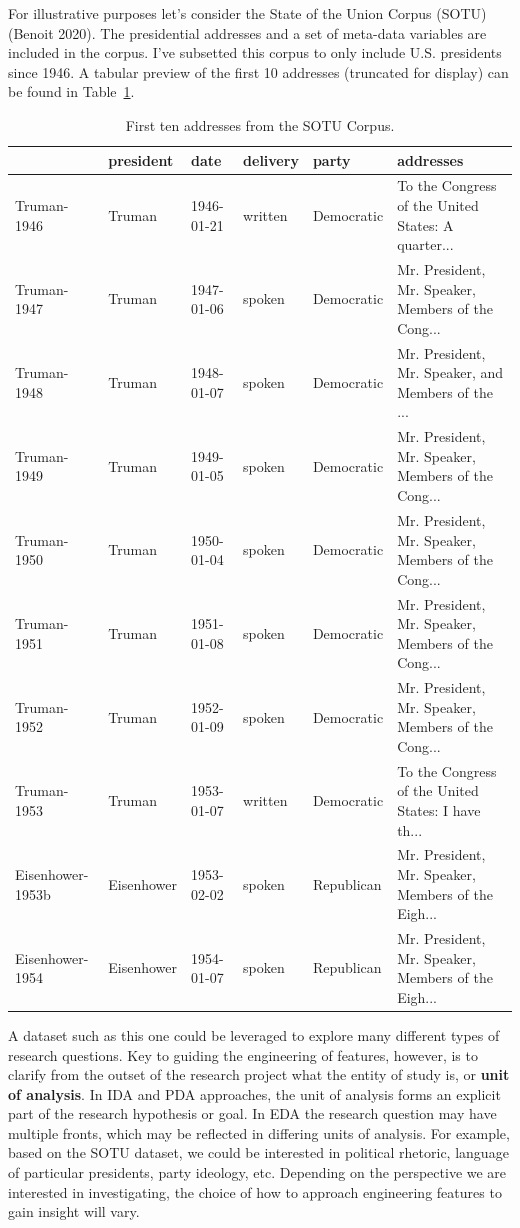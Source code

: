 \documentclass[
  letterpaper,
]{latex/krantz}
\begin{document}
For illustrative purposes let's consider the State of the Union Corpus
(SOTU) (Benoit 2020). The presidential addresses and a set of meta-data
variables are included in the corpus. I've subsetted this corpus to only
include U.S. presidents since 1946. A tabular preview of the first 10
addresses (truncated for display) can be found in
Table~\ref{tbl-eda-sotu-corpus}.

\hypertarget{tbl-eda-sotu-corpus}{}
\begin{table}
\caption{\label{tbl-eda-sotu-corpus}First ten addresses from the SOTU Corpus. }\tabularnewline

\centering
\begin{tabular}{l|l|l|l|l|l}
\hline
  & president & date & delivery & party & addresses\\
\hline
Truman-1946 & Truman & 1946-01-21 & written & Democratic & To the Congress of the United States: A quarter...\\
\hline
Truman-1947 & Truman & 1947-01-06 & spoken & Democratic & Mr. President, Mr. Speaker, Members of the Cong...\\
\hline
Truman-1948 & Truman & 1948-01-07 & spoken & Democratic & Mr. President, Mr. Speaker, and Members of the ...\\
\hline
Truman-1949 & Truman & 1949-01-05 & spoken & Democratic & Mr. President, Mr. Speaker, Members of the Cong...\\
\hline
Truman-1950 & Truman & 1950-01-04 & spoken & Democratic & Mr. President, Mr. Speaker, Members of the Cong...\\
\hline
Truman-1951 & Truman & 1951-01-08 & spoken & Democratic & Mr. President, Mr. Speaker, Members of the Cong...\\
\hline
Truman-1952 & Truman & 1952-01-09 & spoken & Democratic & Mr. President, Mr. Speaker, Members of the Cong...\\
\hline
Truman-1953 & Truman & 1953-01-07 & written & Democratic & To the Congress of the United States: I have th...\\
\hline
Eisenhower-1953b & Eisenhower & 1953-02-02 & spoken & Republican & Mr. President, Mr. Speaker, Members of the Eigh...\\
\hline
Eisenhower-1954 & Eisenhower & 1954-01-07 & spoken & Republican & Mr. President, Mr. Speaker, Members of the Eigh...\\
\hline
\end{tabular}
\end{table}

A dataset such as this one could be leveraged to explore many different
types of research questions. Key to guiding the engineering of features,
however, is to clarify from the outset of the research project what the
entity of study is, or \textbf{unit of analysis}. In IDA and PDA
approaches, the unit of analysis forms an explicit part of the research
hypothesis or goal. In EDA the research question may have multiple
fronts, which may be reflected in differing units of analysis. For
example, based on the SOTU dataset, we could be interested in political
rhetoric, language of particular presidents, party ideology, etc.
Depending on the perspective we are interested in investigating, the
choice of how to approach engineering features to gain insight will
vary.
\end{document}
